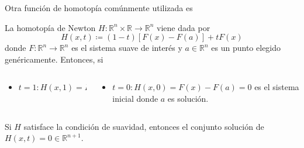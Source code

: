 \begin{frame}
	Otra función de homotopía comúnmente utilizada es
	\begin{definition}
		La \alert{homotopía de Newton}
		$H\colon\mathbb{R}^{n}\times\mathbb{R}\to\mathbb{R}^{n}$ viene
		dada por
		\begin{equation}\label{eq:newtonhomotopy}
			H\left(x,t\right)\coloneqq
			\left(1-t\right)
			\left[
				F\left(x\right)-
				F\left(a\right)
				\right]+
			tF\left(x\right)
		\end{equation}
		donde
		\begin{math}
			F\colon\mathbb{R}^{n}\to\mathbb{R}^{n}
		\end{math}
		es el sistema suave de interés y $a\in\mathbb{R}^{n}$ es un punto
		elegido genéricamente.
		Entonces, si
	\end{definition}

	\begin{columns}
		\begin{column}{0.28\textwidth}
			\begin{itemize}
				\item

				      \begin{math}
					      t=1:
					      H\left(x,1\right)=
					      F\left(x\right)=
					      0.
				      \end{math}
			\end{itemize}
		\end{column}
		\begin{column}{0.68\textwidth}
			\begin{itemize}
				\item

				      \begin{math}
					      t=0:
					      H\left(x,0\right)=
					      F\left(x\right)-F\left(a\right)=
					      0
				      \end{math}
				      es el sistema inicial donde $a$ es solución.
			\end{itemize}
		\end{column}
	\end{columns}

	Si $H$ satisface la condición de suavidad, entonces el
	conjunto solución de $H\left(x,t\right)=0\in\mathbb{R}^{n+1}$.


\end{frame}
